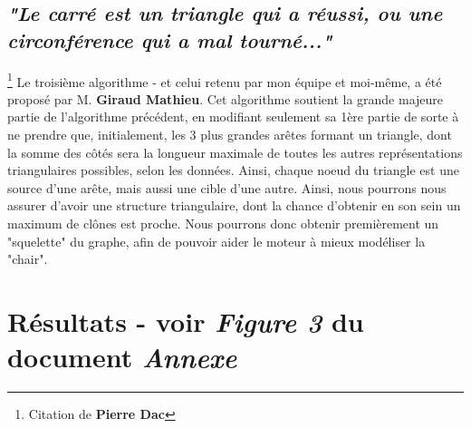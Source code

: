 \documentclass[12pt]{report}
\begin{document}
\begin{spacing}{1.2}
\subsection{\textit{"Le carré est un triangle qui a réussi, ou une circonférence qui a mal tourné..."}}\footnote{Citation de \textbf{Pierre Dac}}
Le troisième algorithme - et celui retenu par mon équipe et moi-même, a été proposé par M. \textbf{Giraud Mathieu}.
\newline
Cet algorithme soutient la grande majeure partie de l'algorithme précédent, en modifiant seulement sa 1ère partie de sorte à ne prendre que, initialement, les 3 plus grandes arêtes formant un triangle, dont la somme des côtés sera la longueur maximale de toutes les autres représentations triangulaires possibles, selon les données. Ainsi, chaque noeud du triangle est une source d'une arête, mais aussi une cible d'une autre.
\newline
Ainsi, nous pourrons nous assurer d'avoir une structure triangulaire, dont la chance d'obtenir en son sein un maximum de clônes est proche.
\newline
Nous pourrons donc obtenir premièrement un "squelette" du graphe, afin de pouvoir aider le moteur à mieux modéliser la "chair".

\section{Résultats  - voir \textit{Figure 3} du document \textit{Annexe}}


\end{spacing}
\end{document}

